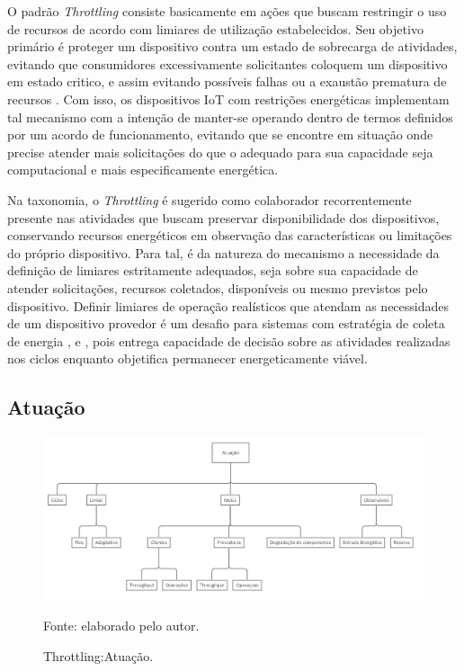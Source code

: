 O padrão \textit{Throttling} consiste basicamente em ações que buscam restringir o uso de recursos de acordo com limiares de utilização estabelecidos. Seu objetivo primário é proteger um dispositivo contra um estado de sobrecarga de atividades, evitando que consumidores excessivamente solicitantes coloquem um dispositivo em estado critico, e assim evitando possíveis falhas ou a exaustão prematura de recursos \cite{martinekuan_throttling_nodate}. Com isso, os dispositivos \acs{IoT} com restrições energéticas implementam tal mecanismo com a intenção de manter-se operando dentro de termos definidos por um acordo de funcionamento, evitando que se encontre em situação onde precise atender mais solicitações do que o adequado para sua capacidade seja computacional e mais especificamente energética.

Na taxonomia, o \textit{Throttling} é sugerido como colaborador recorrentemente presente nas atividades que buscam preservar disponibilidade dos dispositivos, conservando recursos energéticos em observação das características ou limitações do próprio dispositivo. Para tal, é da natureza do mecanismo a necessidade da definição de limiares estritamente adequados, seja sobre sua capacidade de atender solicitações, recursos coletados, disponíveis ou mesmo previstos pelo dispositivo. Definir limiares de operação realísticos que atendam as necessidades de um dispositivo provedor é um desafio para sistemas com estratégia de coleta de energia \cite{khairnar_discrete-rate_2015}, \cite{liu_energy_2016} e \cite{zhang_toward_2018}, pois entrega capacidade de decisão sobre as atividades realizadas nos ciclos enquanto objetifica permanecer energeticamente viável.

\subsection{Atuação}
\label{cap4:atuação}

\begin{figure}[hbt]
	\centering
	\caption{Throttling:Atuação.}
	\label{fig:taxonomia_atuacao}
	\includegraphics[width=1\textwidth]{Imagens/cap4/cap4taxonomia_throttling_atuacao.jpg}	
	
	Fonte: elaborado pelo autor.
\end{figure}


